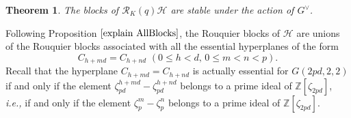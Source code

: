 \documentclass[10pt,a4paper,titlepage]{article}
\newtheorem{theorem}{Theorem}[section]
\newcommand{\ie}{\emph{i.e., }}
\begin{document}
\begin{theorem}\label{2}
The blocks of 
$\mathcal{R}_K(q)\mathcal{H}$ are stable under the action of $G^\vee$.
\end{theorem}
\begin{apod}{Following Proposition $\ref{explain AllBlocks}$, the Rouquier blocks of $\mathcal{H}$ are unions of the Rouquier blocks associated with all the essential hyperplanes of the form
$$C_{h+md}=C_{h+nd} \,\,(0 \leq h < d,\,0 \leq m < n < p).$$
Recall that the hyperplane
$C_{h+md}=C_{h+nd} $ is actually essential for $G(2pd,2,2)$ if and only if
the element $\zeta_{pd}^{h+md}-\zeta_{pd}^{h+nd}$ belongs to a prime ideal of
$\mathbb{Z}[\zeta_{2pd}]$, \ie if and only if the element $\zeta_{p}^{m}-\zeta_{p}^{n}$ belongs to a prime ideal of $\mathbb{Z}[\zeta_{2pd}]$.


}
\end{apod}
\end{document}
